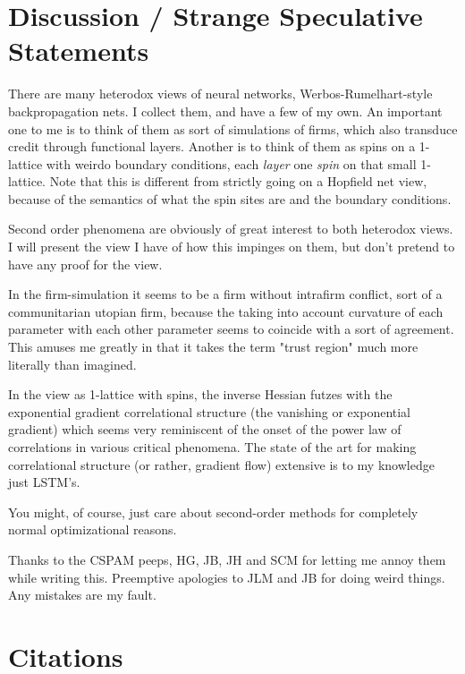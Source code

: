 \documentclass{article}
\begin{document}
\section{Discussion / Strange Speculative Statements}

There are many heterodox views of neural networks, Werbos-Rumelhart-style backpropagation nets. I collect them, and have a few of my own. An important one to me is to think of them as sort of simulations of firms, which also transduce credit through functional layers. Another is to think of them as spins on a 1-lattice with weirdo boundary conditions, each \textit{layer} one \textit{spin} on that small 1-lattice. Note that this is different from strictly going on a Hopfield net view, because of the semantics of what the spin sites are and the boundary conditions.

Second order phenomena are obviously of great interest to both heterodox views. I will present the view I have of how this impinges on them, but don't pretend to have any proof for the view.

In the firm-simulation it seems to be a firm without intrafirm conflict, sort of a communitarian utopian firm, because the taking into account curvature of each parameter with each other parameter seems to coincide with a sort of agreement. This amuses me greatly in that it takes the term "trust region" much more literally than imagined.

In the view as 1-lattice with spins, the inverse Hessian futzes with the exponential gradient correlational structure (the vanishing or exponential gradient) which seems very reminiscent of the onset of the power law of correlations in various critical phenomena. The state of the art for making correlational structure (or rather, gradient flow) extensive is to my knowledge just LSTM's\cite{lstm}.

You might, of course, just care about second-order methods for completely normal optimizational reasons.

Thanks to the CSPAM peeps, HG, JB, JH and SCM for letting me annoy them while writing this. Preemptive apologies to JLM and JB for doing weird things. Any mistakes are my fault.

\section{Citations}
\end{document}
